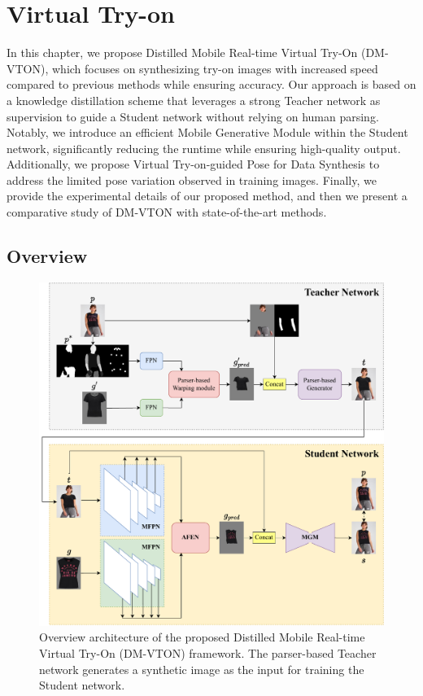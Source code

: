 \chapter{Virtual Try-on}
\label{chapter-virtual-tryon}
\begin{ChapAbstract}
In this chapter, we propose Distilled Mobile Real-time Virtual Try-On (DM-VTON), which focuses on synthesizing try-on images with increased speed compared to previous methods while ensuring accuracy. Our approach is based on a knowledge distillation scheme that leverages a strong Teacher network as supervision to guide a Student network without relying on human parsing. Notably, we introduce an efficient Mobile Generative Module within the Student network, significantly reducing the runtime while ensuring high-quality output. Additionally, we propose Virtual Try-on-guided Pose for Data Synthesis to address the limited pose variation observed in training images. Finally, we provide the experimental details of our proposed method, and then we present a comparative study of DM-VTON with state-of-the-art methods.
\end{ChapAbstract}

\section{Overview}
\begin{figure}[h!]
  \centering
  \includegraphics[width=\textwidth]{content/resources/images/tryon/mobile-tryon.pdf}
  \caption{Overview architecture of the proposed Distilled Mobile Real-time Virtual Try-On (DM-VTON) framework. The parser-based Teacher network generates a synthetic image as the input for training the Student network.}
  \label{fig:mobile-tryon}
  \vspace{-1mm}
\end{figure}

